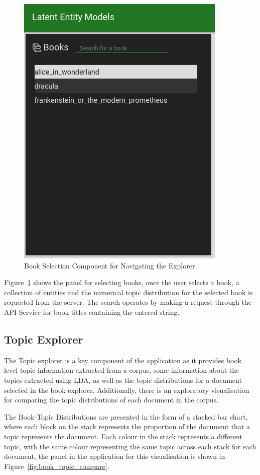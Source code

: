 \documentclass[10pt]{report}
\begin{document}
\begin{figure}[h!]
  \centering
  \includegraphics[scale=0.5]{book_list}
  \caption{Book Selection Component for Navigating the Explorer.\label{fig:book_selection}}
\end{figure}

Figure~\ref{fig:book_selection} shows the panel for selecting books, once the user selects a book, a collection of entities and the numerical topic distribution for the selected book is requested from the server. The search operates by making a request through the API Service for book titles containing the entered string.


\subsection{Topic Explorer}
The Topic explorer is a key component of the application as it provides book level topic information extracted from a corpus, some information about the topics extracted using LDA, as well as the topic distributions for a document selected in the book explorer. Additionally, there is an exploratory visualisation for comparing the topic distributions of each document in the corpus.

The Book-Topic Distributions are presented in the form of a stacked bar chart, where each block on the stack represents the proportion of the document that a topic represents the document. Each colour in the stack represents a different topic, with the same colour representing the same topic across each stack for each document, the panel in the application for this visualisation is shown in Figure~\ref{fig:book_topic_compare}.
\end{document}
